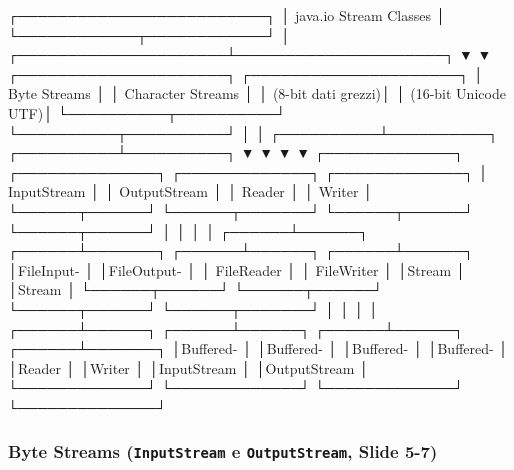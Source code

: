 \documentclass[11pt,a4paper,oneside]{report}
\begin{document}
\needspace{7cm}
\begin{asciibox}
                      ┌─────────────────────────┐
                      │ java.io Stream Classes  │
                      └────────────┬────────────┘
                                   │
             ┌─────────────────────┴─────────────────────┐
             ▼                                           ▼
  ┌─────────────────────┐                     ┌─────────────────────┐
  │    Byte Streams     │                     │  Character Streams  │
  │  (8-bit dati grezzi)│                     │ (16-bit Unicode UTF)│
  └──────────┬──────────┘                     └──────────┬──────────┘
             │                                           │
  ┌──────────┴──────────┐                     ┌──────────┴──────────┐
  ▼                     ▼                     ▼                     ▼
┌─────────────┐ ┌──────────────┐       ┌─────────────┐ ┌─────────────┐
│ InputStream │ │ OutputStream │       │   Reader    │ │   Writer    │
└──────┬──────┘ └──────┬───────┘       └──────┬──────┘ └──────┬──────┘
       │               │                      │               │
┌──────┴──────┐ ┌──────┴───────┐       ┌──────┴──────┐ ┌──────┴──────┐
│FileInput-   │ │FileOutput-   │       │ FileReader  │ │ FileWriter  │
│Stream       │ │Stream        │       └──────┬──────┘ └──────┬──────┘
└──────┬──────┘ └──────┬───────┘              │               │
       │               │               ┌──────┴──────┐ ┌──────┴──────┐
┌──────┴──────┐ ┌──────┴───────┐       │Buffered-    │ │Buffered-    │
│Buffered-    │ │Buffered-     │       │Reader       │ │Writer       │
│InputStream  │ │OutputStream  │       └─────────────┘ └─────────────┘
└─────────────┘ └──────────────┘
\end{asciibox}

\subsubsection{\texorpdfstring{Byte Streams (\texttt{InputStream} e
\texttt{OutputStream}, Slide
5-7)}{Byte Streams (InputStream e OutputStream, Slide 5-7)}}\label{chap19_byte-streams-inputstream-e-outputstream-slide-5-7}
\end{document}
